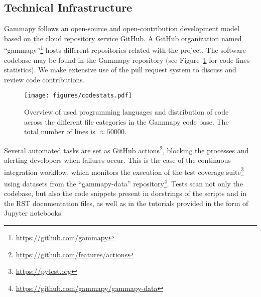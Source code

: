 \documentclass[longauth]{aa}
\newcommand{\gammapy}{Gammapy\xspace}
\newcommand{\github}{GitHub\xspace}
\begin{document}
\subsection{Technical Infrastructure}
\label{ssec:technical-infrastructure}

\gammapy follows an open-source and open-contribution development model based on
the cloud repository service \github. A \github organization named
\enquote{gammapy}\footnote{\url{https://github.com/gammapy}} hosts different
repositories related with the project. The software codebase may be found in
the Gammapy repository (see
Figure~\ref{fig:codestats:lang} for code lines statistics). We make extensive
use of the pull request system to discuss and review code contributions.


\begin{figure}[t]
        \centering
        \texttt{[image: figures/codestats.pdf]}
        \caption{
                Overview of used programming languages and distribution of code across the different file
        categories in the \gammapy code base. The total number of lines is $\approx 50 000$.
    }
        \label{fig:codestats:lang}
\end{figure}

Several automated tasks are set as \github
actions\footnote{\url{https://github.com/features/actions}}, blocking the
processes and alerting developers when failures occur. This is the case of the
continuous integration workflow, which monitors the execution of the test coverage
suite\footnote{\url{https://pytest.org}} using datasets from the
\enquote{gammapy-data} repository\footnote{\url{https://github.com/gammapy/gammapy-data}}.
Tests scan not only the codebase, but also the
code snippets present in docstrings of the scripts and in the RST documentation
files, as well as in the tutorials provided in the form of Jupyter notebooks.
\end{document}
